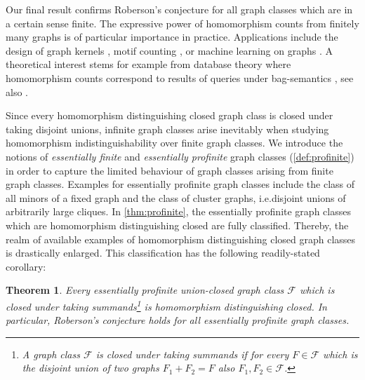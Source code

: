 \documentclass[3p,final]{elsarticle}
\newtheorem{theorem}{Theorem}
\begin{document}
	
	


	




	
	





	Our final result confirms Roberson's conjecture for all graph classes which are in a certain sense finite.
	The expressive power of homomorphism counts from finitely many graphs is of particular importance in practice. 
	Applications include the design of graph kernels \cite{KriegeJM20}, motif counting \cite{AlonDHHS08,milo2002network}, or machine learning on graphs \cite{BeaujeanSY21,NguyenM20,Grohe-x2vec}.
	A theoretical interest stems for example from database theory where homomorphism counts correspond to results of queries under bag-semantics \cite{chaudhuri_optimization_1993,kwiecien_determinacy_2022}, 
	see also \cite{chen_algorithms_2022}.
	
	Since every homomorphism distinguishing closed graph class is closed under taking disjoint unions, infinite graph classes arise inevitably when studying homomorphism indistinguishability over finite graph classes.
	We introduce the notions of \emph{essentially finite} and \emph{essentially profinite} graph classes (\cref{def:profinite}) in order to capture the limited behaviour of graph classes arising from finite graph classes.
	Examples for essentially profinite graph classes include the class of all minors of a fixed graph and the class of cluster graphs, i.e.\@ disjoint unions of arbitrarily large cliques.
	In \cref{thm:profinite}, the essentially profinite graph classes which are homomorphism distinguishing closed are fully classified. 
	Thereby, the realm of available examples of homomorphism distinguishing closed graph classes is drastically enlarged.
	This classification has the following readily-stated corollary:

	
	\begin{theorem} \label{thm:main3}
		Every essentially profinite union-closed graph class $\mathcal{F}$ which is closed under taking summands\footnote{A graph class $\mathcal{F}$ is \emph{closed under taking summands} if for every $F \in \mathcal{F}$ which is the disjoint union of two graphs $F_1 + F_2 = F$ also $F_1, F_2 \in \mathcal{F}$.} is homomorphism distinguishing closed.
		In particular, Roberson's conjecture holds for all essentially profinite graph classes.
	\end{theorem}
\end{document}
